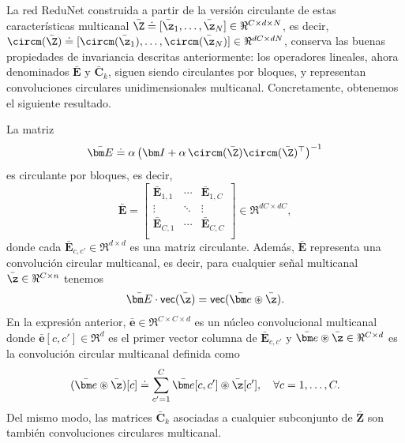 \documentclass[../../book-main.tex]{subfiles}
\begin{document}
La red ReduNet construida a partir de la versión circulante de estas características multicanal
$\bar\Z \doteq [\bar \z_1, \ldots, \bar \z_N] \in \Re^{C
\times d \times N}$, es decir, $\circm(\bar\Z) \doteq [ \circm(\bar\z_1),
\dots, \circm(\bar\z_N)] \in \Re^{dC \times dN}$, conserva las buenas
propiedades de invariancia descritas anteriormente: los operadores lineales, ahora
denominados $\bar{\bm E}$ y $\bar{\bm C}_k$, siguen siendo circulantes por bloques,
y representan convoluciones circulares unidimensionales multicanal.
Concretamente, obtenemos el siguiente resultado.
\begin{proposition}
    La matriz
    \begin{equation}
        \label{eq:def-E-bar}
        \bar{\bm E} \doteq \alpha\left(\bm I + \alpha\,
        \circm(\bar\Z) \circm(\bar\Z)^\top \right) ^{-1}
    \end{equation}
    es circulante por bloques, es decir,
    \begin{equation}
        \bar{\bm E} =
        \left[
            \begin{matrix}
                \bar{\bm E}_{1, 1} & \cdots & \bar{\bm E}_{1, C}\\
                \vdots & \ddots & \vdots \\
                \bar{\bm E}_{C, 1} & \cdots & \bar{\bm E}_{C, C}\\
        \end{matrix}\right] \in \Re^{dC \times dC},
    \end{equation}
    donde cada $\bar{\bm E}_{c, c'}\in \Re^{d \times d}$ es una
    matriz circulante. Además, $\bar{\bm E}$ representa una
    convolución circular multicanal, es decir, para cualquier señal multicanal
    $\bar\z \in \Re^{C \times n}$ tenemos
    \begin{equation}
        \bar{\bm E} \cdot \textsf{vec}(\bar\z) = \textsf{vec}( \bar{\bm
        e} \circledast \bar\z).
    \end{equation}
    En la expresión anterior, $\bar{\bm e} \in \Re^{C \times C \times d}$ es un
    núcleo convolucional multicanal donde $\bar{\bm e}[c, c'] \in
    \Re^{d}$ es el primer vector columna de $\bar{\bm E}_{c, c'}$
    y $\bar{\bm e} \circledast \bar\z \in \Re^{C \times d}$ es la
    convolución circular multicanal definida como
    \begin{equation}
        (\bar{\bm e} \circledast \bar\z)[c] \doteq \sum_{c'=1}^C
        \bar{\bm e}[c, c'] \circledast \bar{\z}[c'], \quad \forall c
        = 1, \ldots, C.
    \end{equation}
    Del mismo modo, las matrices $\bar{\bm C}_k$ asociadas a cualquier
    subconjunto de $\bar{\bm Z}$ son también convoluciones circulares multicanal.
    \label{prop:multichannel-circular-conv-1}
\end{proposition}
\end{document}
